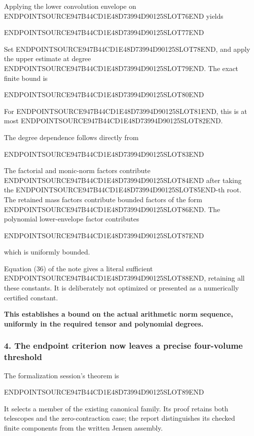 Applying the lower convolution envelope on ENDPOINTSOURCE947B44CD1E48D73994D90125SLOT76END yields

ENDPOINTSOURCE947B44CD1E48D73994D90125SLOT77END

Set ENDPOINTSOURCE947B44CD1E48D73994D90125SLOT78END, and apply the upper estimate at degree ENDPOINTSOURCE947B44CD1E48D73994D90125SLOT79END. The exact finite bound is

ENDPOINTSOURCE947B44CD1E48D73994D90125SLOT80END

For ENDPOINTSOURCE947B44CD1E48D73994D90125SLOT81END, this is at most ENDPOINTSOURCE947B44CD1E48D73994D90125SLOT82END.

The degree dependence follows directly from

ENDPOINTSOURCE947B44CD1E48D73994D90125SLOT83END

The factorial and monic-norm factors contribute ENDPOINTSOURCE947B44CD1E48D73994D90125SLOT84END after taking the ENDPOINTSOURCE947B44CD1E48D73994D90125SLOT85END-th root. The retained mass factors contribute bounded factors of the form ENDPOINTSOURCE947B44CD1E48D73994D90125SLOT86END. The polynomial lower-envelope factor contributes

ENDPOINTSOURCE947B44CD1E48D73994D90125SLOT87END

which is uniformly bounded.

Equation (36) of the note gives a literal sufficient ENDPOINTSOURCE947B44CD1E48D73994D90125SLOT88END, retaining all these constants. It is deliberately not optimized or presented as a numerically certified constant.

\textbf{This establishes a bound on the actual arithmetic norm sequence, uniformly in the required tensor and polynomial degrees.}

\subsubsection{4. The endpoint criterion now leaves a precise four-volume threshold}\label{endpoint-user_norm_original--the-endpoint-criterion-now-leaves-a-precise-four-volume-threshold}

The formalization session's theorem is

ENDPOINTSOURCE947B44CD1E48D73994D90125SLOT89END

It selects a member of the existing canonical family. Its proof retains both telescopes and the zero-contraction case; the report distinguishes its checked finite components from the written Jensen assembly.

